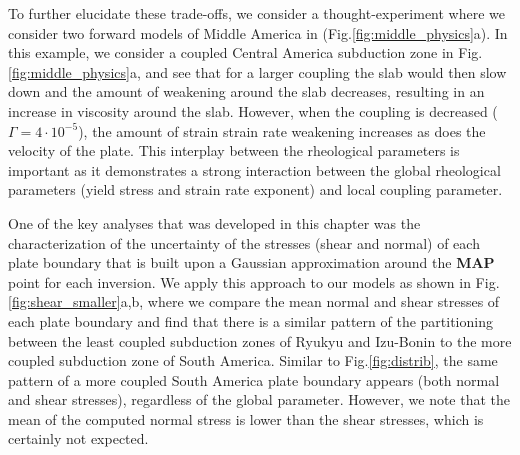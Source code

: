 \documentclass[12pt]{article}
\begin{document}
To further elucidate these trade-offs, we consider a thought-experiment where we consider two forward models of Middle America in (Fig.\ref{fig:middle_physics}a). In this example, we consider a coupled Central America subduction zone in Fig.\ref{fig:middle_physics}a, and see  that for a larger coupling the slab would then slow down and the amount of weakening around the slab decreases, resulting in an increase in viscosity around the slab. However, when the coupling is decreased ($\Gamma=4\cdot 10^{-5}$), the amount of strain strain rate weakening increases as does the velocity of the plate. This interplay between the rheological parameters is important as it demonstrates a strong interaction between the global rheological parameters (yield stress and strain rate exponent) and local coupling parameter.

One of the key analyses that was developed in this chapter was the characterization of the uncertainty of the stresses (shear and normal) of each plate boundary that is built upon a Gaussian approximation around the \textbf{MAP} point for each inversion. We apply this approach to our models as shown in Fig.\ref{fig:shear_smaller}a,b, where we compare the mean normal and shear stresses of each plate boundary and find that there is a similar pattern of the partitioning between the least coupled subduction zones of Ryukyu and Izu-Bonin to the more coupled subduction zone of South America. Similar to Fig.\ref{fig:distrib}, the same pattern of a more coupled South America plate boundary appears (both normal and shear stresses), regardless of the global parameter. However, we note that the mean of the computed normal stress is lower than the shear stresses, which is certainly not expected.
\end{document}
